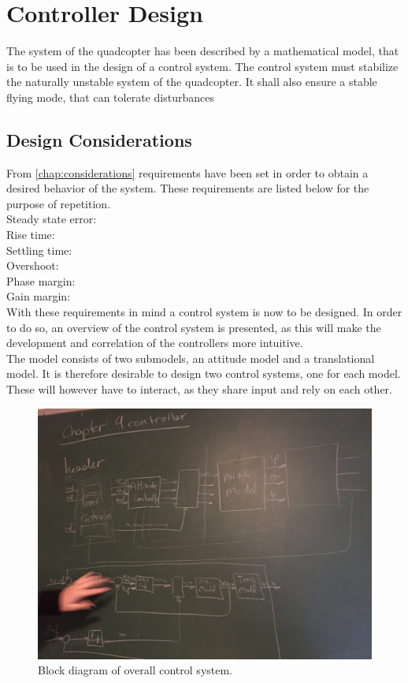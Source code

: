 \chapter{Controller Design}\label{chap:Control}
The system of the quadcopter has been described by a mathematical model, that is to be used in the design of a control system. The control system must stabilize the naturally unstable system of the quadcopter. It shall also ensure a stable flying mode, that can tolerate disturbances 
\section{Design Considerations}
From \ref{chap:considerations} requirements have been set in order to obtain a desired behavior of the system. These requirements are listed below for the purpose of repetition.\\
Steady state error: \\
Rise time: \\
Settling time:\\
Overshoot:\\
Phase margin: \\
Gain margin: \\

With these requirements in mind a control system is now to be designed. In order to do so, an overview of the control system is presented, as this will make the development and correlation of the controllers more intuitive. \\

The model consists of two submodels, an attitude model and a translational model. It is therefore desirable to design two control systems, one for each model. These will however have to interact, as they share input and rely on each other. 

\begin{figure}[H]
	\centering
	\includegraphics[width=0.7 \textwidth]{figures/ControlHeadDiagram.JPG}
	\caption{Block diagram of overall control system.}
	\label{fig:ControlHeadDiagram}
\end{figure}


